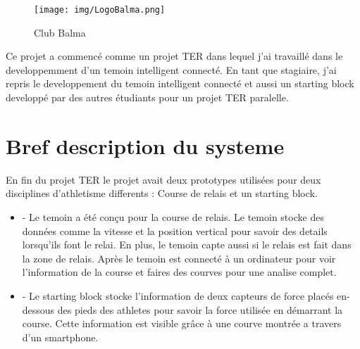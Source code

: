 \documentclass[12pt]{article}
\begin{document}
\begin{figure}[!htb]
\centering
\texttt{[image: img/LogoBalma.png]}
\caption{Club Balma}
\label{img:LogoBalma}
\end{figure}

Ce projet a commenc\'e comme un projet TER dans lequel j'ai travaill\'e dans le developpemment d'un temoin intelligent connect\'e. En tant que stagiaire, j'ai repris le developpement du temoin intelligent connect\'e et aussi un starting block developp\'e par des autres \'etudiants pour un projet TER paralelle.


\section{Bref description du systeme}
En fin du projet TER le projet avait deux prototypes utilis\'ees
pour deux disciplines d'athletisme differents : Course de 
relais et un starting block.

\begin{itemize}
	\item - Le temoin a \'et\'e con\c cu pour la course de relais. Le temoin stocke
	des donn\'ees comme la vitesse et la  position vertical pour
	savoir des details lorsqu'ils font le relai.
	En plus, le temoin capte aussi si le relais est fait 
	dans la zone de relais. Apr\`es le temoin est connect\'e \`a un
	ordinateur pour voir l'information de la course et faires des
	courves pour une analise complet. 

	\item - Le starting block stocke l'information de deux capteurs de force
	plac\'es en-dessous des pieds des athletes pour savoir la force utilis\'ee
	en d\'emarrant la course. Cette information est visible
	gr\^ace \`a une courve montr\'ee a travers d'un smartphone.
\end{itemize}
\end{document}
